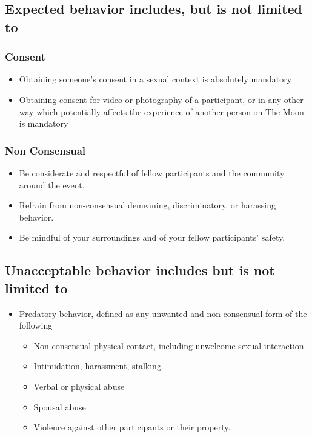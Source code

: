 \begin{multicols}{2}
\subsection*{Expected behavior includes, but is not limited to}

	\subsubsection*{Consent}
    \begin{itemize}[noitemsep]
    	\item Obtaining someone’s consent in a sexual context is absolutely mandatory
        \item Obtaining consent for video or photography of a participant, or in any other way which potentially affects the experience of another person on The Moon is mandatory
	\end{itemize}
        
    \subsubsection*{Non Consensual}
    \begin{itemize}[noitemsep]
        \item Be considerate and respectful of fellow participants and the community around the event.
        \item Refrain from non-consensual demeaning, discriminatory, or harassing behavior.
        \item Be mindful of your surroundings and of your fellow participants’ safety.
	\end{itemize}

\subsection*{Unacceptable behavior includes but is not limited to}
\begin{itemize}[noitemsep]
    \item Predatory behavior, defined as any unwanted and non-consensual form of the following
    \begin{itemize}[noitemsep]
        \item Non-consensual physical contact, including unwelcome sexual interaction
        \item Intimidation, harassment, stalking
        \item Verbal or physical abuse
        \item Spousal abuse
        \item Violence against other participants or their property.
	\end{itemize}
         

\end{itemize}
\end{multicols}
